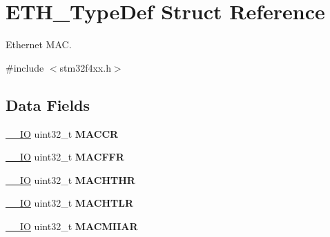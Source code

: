 \hypertarget{struct_e_t_h___type_def}{\section{E\-T\-H\-\_\-\-Type\-Def Struct Reference}
\label{struct_e_t_h___type_def}
}


Ethernet M\-A\-C.  




{\ttfamily \#include $<$stm32f4xx.\-h$>$}

\subsection*{Data Fields}
\begin{DoxyCompactItemize}
\item 
\hypertarget{struct_e_t_h___type_def_a20acbcac1c35f66de94c9ff0e2ddc7b0}{\hyperlink{group___c_m_s_i_s__core__definitions_gaec43007d9998a0a0e01faede4133d6be}{\-\_\-\-\_\-\-I\-O} uint32\-\_\-t {\bfseries M\-A\-C\-C\-R}}\label{struct_e_t_h___type_def_a20acbcac1c35f66de94c9ff0e2ddc7b0}

\item 
\hypertarget{struct_e_t_h___type_def_a8ad4e3dbde1518ecde5d979c2a89a76a}{\hyperlink{group___c_m_s_i_s__core__definitions_gaec43007d9998a0a0e01faede4133d6be}{\-\_\-\-\_\-\-I\-O} uint32\-\_\-t {\bfseries M\-A\-C\-F\-F\-R}}\label{struct_e_t_h___type_def_a8ad4e3dbde1518ecde5d979c2a89a76a}

\item 
\hypertarget{struct_e_t_h___type_def_a121212bdb227106df681d24e5d896a4e}{\hyperlink{group___c_m_s_i_s__core__definitions_gaec43007d9998a0a0e01faede4133d6be}{\-\_\-\-\_\-\-I\-O} uint32\-\_\-t {\bfseries M\-A\-C\-H\-T\-H\-R}}\label{struct_e_t_h___type_def_a121212bdb227106df681d24e5d896a4e}

\item 
\hypertarget{struct_e_t_h___type_def_a1d34ab8e5c2041c00ba9526b3958099d}{\hyperlink{group___c_m_s_i_s__core__definitions_gaec43007d9998a0a0e01faede4133d6be}{\-\_\-\-\_\-\-I\-O} uint32\-\_\-t {\bfseries M\-A\-C\-H\-T\-L\-R}}\label{struct_e_t_h___type_def_a1d34ab8e5c2041c00ba9526b3958099d}

\item 
\hypertarget{struct_e_t_h___type_def_a9ea1e1c6615eb3bd70eb328dba65fc87}{\hyperlink{group___c_m_s_i_s__core__definitions_gaec43007d9998a0a0e01faede4133d6be}{\-\_\-\-\_\-\-I\-O} uint32\-\_\-t {\bfseries M\-A\-C\-M\-I\-I\-A\-R}}\label{struct_e_t_h___type_def_a9ea1e1c6615eb3bd70eb328dba65fc87}


\end{DoxyCompactItemize}
